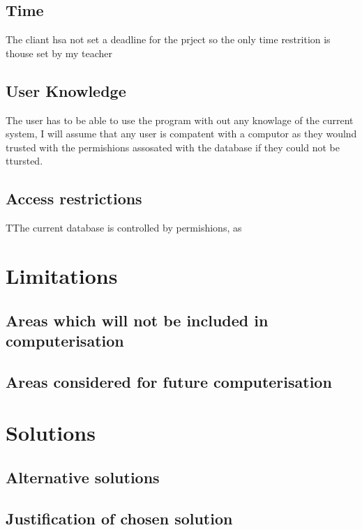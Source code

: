 \subsection{Time}
The cliant hsa not set a deadline for the prject so the only time restrition is thouse set by my teacher
\subsection{User Knowledge}
The user has to be able to use the program with out any knowlage of the current system, I will assume that any user is compatent with a computor as they woulnd  trusted with the permishions assosated with the database if they could not be ttursted.
\subsection{Access restrictions}
TThe current database is controlled by permishions, as 
\section{Limitations}

\subsection{Areas which will not be included in computerisation}

\subsection{Areas considered for future computerisation}

\section{Solutions}

\subsection{Alternative solutions}

\subsection{Justification of chosen solution}
